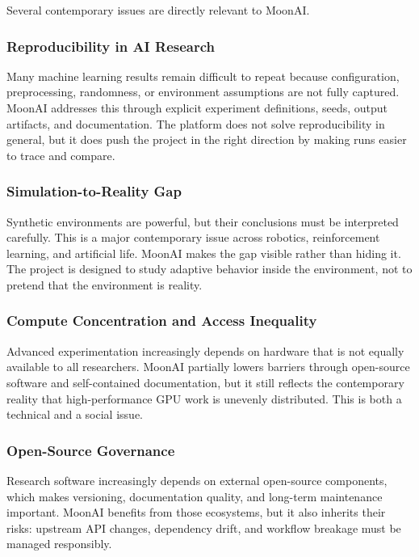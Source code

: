 Several contemporary issues are directly relevant to MoonAI.

\subsubsection{Reproducibility in AI Research}

Many machine learning results remain difficult to repeat because configuration, preprocessing,
randomness, or environment assumptions are not fully captured. MoonAI addresses this through
explicit experiment definitions, seeds, output artifacts, and documentation. The platform does
not solve reproducibility in general, but it does push the project in the right direction by
making runs easier to trace and compare.

\subsubsection{Simulation-to-Reality Gap}

Synthetic environments are powerful, but their conclusions must be interpreted carefully. This
is a major contemporary issue across robotics, reinforcement learning, and artificial life.
MoonAI makes the gap visible rather than hiding it. The project is designed to study adaptive
behavior inside the environment, not to pretend that the environment is reality.

\subsubsection{Compute Concentration and Access Inequality}

Advanced experimentation increasingly depends on hardware that is not equally available to all
researchers. MoonAI partially lowers barriers through open-source software and self-contained
documentation, but it still reflects the contemporary reality that high-performance GPU work is
unevenly distributed. This is both a technical and a social issue.

\subsubsection{Open-Source Governance}

Research software increasingly depends on external open-source components, which makes versioning,
documentation quality, and long-term maintenance important. MoonAI benefits from those
ecosystems, but it also inherits their risks: upstream API changes, dependency drift, and
workflow breakage must be managed responsibly.

